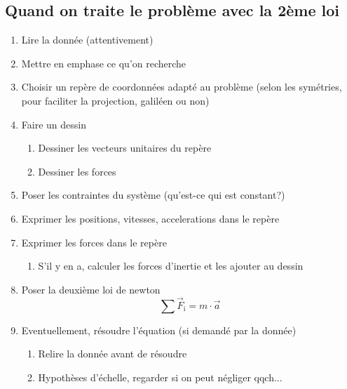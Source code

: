 
    \subsection{Quand on traite le problème avec la 2ème loi}
    \begin{enumerate}
        \item Lire la donnée (attentivement)
        \item Mettre en emphase ce qu'on recherche
        \item Choisir un repère de coordonnées adapté au problème (selon les symétries, pour faciliter la projection, galiléen   ou non)
        \item Faire un dessin
        \begin{enumerate}
            \item Dessiner les vecteurs unitaires du repère
            \item Dessiner les forces
        \end{enumerate}
        \item Poser les contraintes du système (qu'est-ce qui est constant?)
        \item Exprimer les positions, vitesses, accelerations dans le repère
        \item Exprimer les forces dans le repère
        \begin{enumerate}
            \item S'il y en a, calculer les forces d'inertie et les ajouter au dessin
        \end{enumerate}
        \item Poser la deuxième loi de newton 
        \[\sum \vec{F}_\text{i} = m \cdot \vec{a}\]
        \item Eventuellement, résoudre l'équation (si demandé par la donnée)
        \begin{enumerate}
            \item Relire la donnée avant de résoudre
            \item Hypothèses d'échelle, regarder si on peut négliger qqch...
        \end{enumerate}
    \end{enumerate}
    
